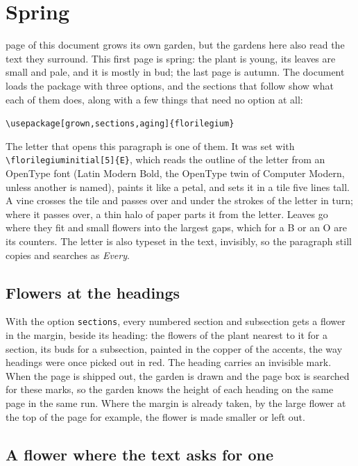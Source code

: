 \documentclass[11pt,a4paper]{article}
\newcommand\code[1]{\texttt{\small #1}}
\begin{document}
\section{Spring}

 page of this document grows its own garden, but the
gardens here also read the text they surround. This first page is spring: the plant is
young, its leaves are small and pale, and it is mostly in bud; the last page is autumn.
The document loads the package with three options, and the sections that follow show what
each of them does, along with a few things that need no option at all:
\begin{center}\code{\textbackslash usepackage[grown,sections,aging]\{florilegium\}}\end{center}

The letter that opens this paragraph is one of them. It was set with
\code{\textbackslash florilegiuminitial[5]\{E\}}, which reads the outline of the letter from an OpenType font (Latin
Modern Bold, the OpenType twin of Computer Modern, unless another is named), paints it
like a petal, and sets it in a tile five lines tall. A vine crosses the tile and passes
over and under the strokes of the letter in turn; where it passes over, a thin halo of
paper parts it from the letter. Leaves go where they fit and small flowers into the
largest gaps, which for a B or an O are its counters. The letter is also typeset in the
text, invisibly, so the paragraph still copies and searches as \emph{Every}.

\subsection{Flowers at the headings}

With the option \code{sections}, every numbered section and subsection gets a flower in the
margin, beside its heading: the flowers of the plant nearest to it for a section, its buds
for a subsection, painted in the copper of the accents, the way headings were once picked
out in red. The heading carries an invisible mark. When the page is shipped out, the
garden is drawn and the page box is searched for these marks, so the garden knows the
height of each heading on the same page in the same run. Where the margin is already
taken, by the large flower at the top of the page for example, the flower is made
smaller or left out.

\subsection{A flower where the text asks for one}
\end{document}
